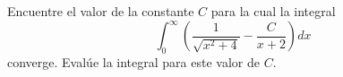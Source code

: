 \item Encuentre el valor de la constante $C$ para la cual la integral
    \[ \int_{0}^{\infty} \left( \frac{1}{\sqrt{x^2 + 4}} - \frac{C}{x + 2} \right) dx \]
    converge. Evalúe la integral para este valor de $C$.
